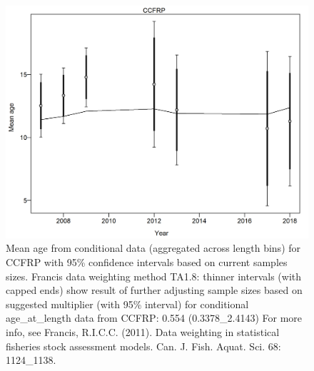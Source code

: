 \documentclass[12pt,]{article}
\begin{document}
\begin{figure}
\centering
\includegraphics{./r4ss/plots_mod1/comp_condAALfit_data_weighting_TA1.8_condAgeCCFRP.png}
\caption{Mean age from conditional data (aggregated across length bins)
for CCFRP with 95\% confidence intervals based on current samples sizes.
Francis data weighting method TA1.8: thinner intervals (with capped
ends) show result of further adjusting sample sizes based on suggested
multiplier (with 95\% interval) for conditional age\_at\_length data
from CCFRP: 0.554 (0.3378\_2.4143) For more info, see Francis, R.I.C.C.
(2011). Data weighting in statistical fisheries stock assessment models.
Can. J. Fish. Aquat. Sci. 68: 1124\_1138.
\label{fig:mod1_12_comp_condAALfit_data_weighting_TA1.8_condAgeCCFRP}}
\end{figure}
\end{document}
